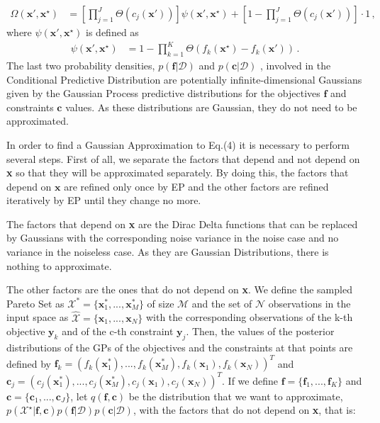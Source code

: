 \begin{align}
\Omega(\textbf{x}',\textbf{x}^{\star}) & = \left[\prod_{j=1}^{J}\Theta(c_j(\mathbf{x}'))\right] 
        \psi(\textbf{x}',\textbf{x}^{\star}) + \left[1 - \prod_{j=1}^{J}\Theta(c_j(\textbf{x}')) \right] \cdot 1
\,,
        \label{eq:omega}
\end{align}
where $\psi(\textbf{x}',\textbf{x}^{\star})$ is defined as
\begin{align}
\psi(\textbf{x}',\textbf{x}^{\star}) & = 1 - \prod_{k=1}^K \Theta (f_k(\textbf{x}^{\star})-f_k(\textbf{x}'))
\,.  \label{eq:psi}
\end{align}
The last two probability densities, $p(\textbf{f}|\mathcal{D})$ and $p(\textbf{c}|\mathcal{D})$ , involved in the Conditional Predictive Distribution are potentially infinite-dimensional Gaussians given by the Gaussian Process predictive distributions for the objectives $\textbf{f}$ and constraints $\textbf{c}$ values. As these distributions are Gaussian, they do not need to be approximated.

In order to find a Gaussian Approximation to Eq.(4) it is necessary to perform several steps. First of all, we separate the factors that depend and not depend on \textbf{x} so that they will be approximated separately. By doing this, the factors that depend on $\boldsymbol{x}$ are refined only once by EP and the other factors are refined iteratively by EP until they change no more.

The factors that depend on \textbf{x} are the Dirac Delta functions that can be replaced by Gaussians with the corresponding noise variance in the noise case and no variance in the noiseless case. As they are Gaussian Distributions, there is nothing to approximate.

The other factors are the ones that do not depend on \textbf{x}. We define the sampled Pareto Set as $\mathcal{X}^{*} = \{\boldsymbol{x}^{*}_{1},...,\boldsymbol{x}^{*}_{M}\}$ of size $\mathcal{M}$ and the set of $\mathcal{N}$ observations in the input space as $\hat{\mathcal{X}} = \{\boldsymbol{x}_1,...,\boldsymbol{x}_N\}$ with the corresponding observations of the k-th objective $\boldsymbol{y}_k$ and of the c-th constraint $\boldsymbol{y}_j$. Then, the values of the posterior distributions of the GPs of the objectives and the constraints at that points are defined by $\boldsymbol{f}_k = ( f_k(\boldsymbol{x}^{*}_1), ... , f_k(\boldsymbol{x}^{*}_M), f_k(\boldsymbol{x}_1),  f_k(\boldsymbol{x}_N))^T$ and $\boldsymbol{c}_j = ( c_j(\boldsymbol{x}^{*}_1), ... , c_j(\boldsymbol{x}^{*}_M), c_j(\boldsymbol{x}_1), c_j(\boldsymbol{x}_N))^T$. If we define $\boldsymbol{f} = \{\boldsymbol{f}_1,...,\boldsymbol{f}_K\}$ and $\boldsymbol{c} = \{\boldsymbol{c}_1,...,\boldsymbol{c}_J\}$, let $q(\boldsymbol{f},\boldsymbol{c})$ be the distribution that we want to approximate, $p(\mathcal{X}^{\star}|\textbf{f},\textbf{c}) p(\textbf{f}|\mathcal{D}) p(\textbf{c}|\mathcal{D})$, with the factors that do not depend on \textbf{x}, that is:

